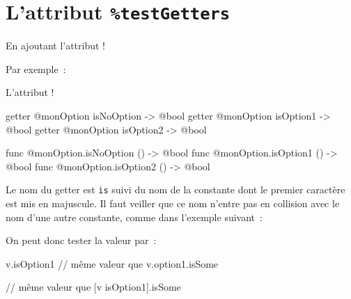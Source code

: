 \section{L'attribut \texttt{\%testGetters}}

En ajoutant l'attribut \ggsq!%

Par exemple~:



L'attribut \ggsq!%
\begin{galgas3}
getter @monOption isNoOption -> @bool
getter @monOption isOption1 -> @bool
getter @monOption isOption2 -> @bool
\end{galgas3}
\begin{galgas3}
func @monOption.isNoOption () -> @bool
func @monOption.isOption1 () -> @bool
func @monOption.isOption2 () -> @bool
\end{galgas3}

Le nom du getter est \texttt{is} suivi du nom de la constante dont le premier caractère est mis en majuscule. Il faut veiller que ce nom n'entre pas en collision avec le nom d'une autre constante, comme dans l'exemple suivant~:



On peut donc tester la valeur par~:
\begin{galgas4}
  v.isOption1 // même valeur que v.option1.isSome
\end{galgas4}
\begin{galgas3}
  [v isOption1] // même valeur que [v isOption1].isSome
\end{galgas3}

